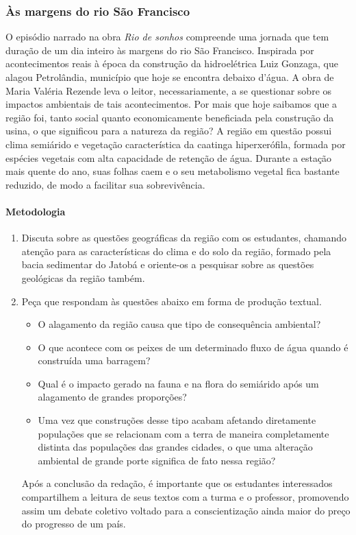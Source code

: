 \documentclass[12pt]{extarticle}
\begin{document}
\subsubsection{Às margens do rio São Francisco}

  O episódio narrado na obra \emph{Rio de sonhos} compreende uma jornada
  que tem duração de um dia inteiro às margens do rio São Francisco.
  Inspirada por acontecimentos reais à época da construção da
  hidroelétrica Luiz Gonzaga, que alagou Petrolândia, município que hoje
  se encontra debaixo d'água. A obra de Maria Valéria Rezende leva o
  leitor, necessariamente, a se questionar sobre os impactos ambientais
  de tais acontecimentos. Por mais que hoje saibamos que a região foi,
  tanto social quanto economicamente beneficiada pela construção da
  usina, o que significou para a natureza da região? A região em questão
  possui clima semiárido e vegetação característica da caatinga
  hiperxerófila, formada por espécies vegetais com alta capacidade de
  retenção de água. Durante a estação mais quente do ano, suas folhas
  caem e o seu metabolismo vegetal fica bastante reduzido, de modo a
  facilitar sua sobrevivência.

\paragraph{Metodologia}
\begin{enumerate}
\item Discuta sobre as questões geográficas da região com os estudantes,
chamando atenção para as características do clima e do solo da
região, formado pela bacia sedimentar do Jatobá e oriente-os a
pesquisar sobre as questões geológicas da região também.


\item Peça que respondam às questões abaixo em forma de produção textual.
\begin{itemize}
\item
  O alagamento da região causa que tipo de consequência ambiental?
\item
  O que acontece com os peixes de um determinado fluxo de água quando é
  construída uma barragem?
\item
  Qual é o impacto gerado na fauna e na flora do semiárido após um
  alagamento de grandes proporções?
\item
  Uma vez que construções desse tipo acabam afetando diretamente
  populações que se relacionam com a terra de maneira completamente
  distinta das populações das grandes cidades, o que uma alteração
  ambiental de grande porte significa de fato nessa região?
\end{itemize}

Após a conclusão da redação, é importante que os estudantes
interessados compartilhem a leitura de seus textos com a turma e o
professor, promovendo assim um debate coletivo voltado para a
conscientização ainda maior do preço do progresso de um país.
\end{enumerate}
\end{document}
